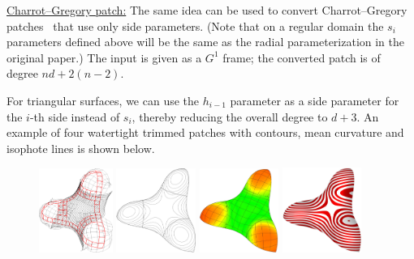 \documentclass{article}
\begin{document}
\vspace{10pt}
\noindent\underline{Charrot--Gregory patch:}\vspace{0.2em}\newline
The same idea can be used to convert Charrot--Gregory patches~\cite{charrot} that use
only side parameters. (Note that on a regular domain the $s_i$ parameters defined above
will be the same as the radial parameterization in the original paper.)
The input is given as a $G^1$ frame; the converted patch is of degree $nd+2(n-2)$.

For triangular surfaces, we can use the $h_{i-1}$ parameter as a side parameter for the $i$-th
side instead of $s_i$, thereby reducing the overall degree to $d+3$.
An example of four watertight trimmed patches with contours, mean curvature
and isophote lines is shown below.
\begin{figure}[h!]
  \includegraphics[width = 0.2139\textwidth]{images/trebol3-cnet.png}
  \hfill
  \includegraphics[width = 0.23\textwidth]{images/trebol3-contour.jpg}
  \hfill
  \includegraphics[width = 0.23\textwidth]{images/trebol3-mean-iso.jpg}
  \hfill
  \includegraphics[width = 0.23\textwidth]{images/trebol3-zebra.jpg}
\end{figure}
\end{document}
